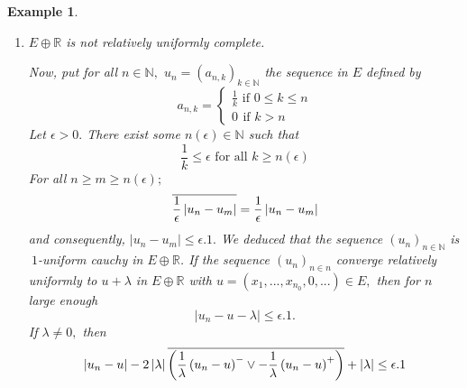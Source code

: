 \documentclass{birkau}
\numberwithin{equation}{section}
\theoremstyle{plain}
\newtheorem{example}[theorem]{Example}
\theoremstyle{definition}
\begin{document}
\begin{example}
\begin{enumerate}
		\item $E\oplus 
		\mathbb{R}
		$ is not relatively uniformly complete.
		
		Now, put for all $n\in 
		\mathbb{N}
		,$ $u_{n}=\left( a_{n,k}\right) _{k\in 
			\mathbb{N}
		}$ the sequence in $E$ defined by%
		\begin{equation*}
			a_{n,k}=\left\{ 
			\begin{array}{l}
				\frac{1}{k}\text{ if }0\leq k\leq n \\ 
				0\,\ \text{if }k>n%
			\end{array}%
			\right. 
		\end{equation*}%
		Let $\epsilon >0.$ There exist some $n(\epsilon )\in 
		\mathbb{N}
		$ such that%
		\begin{equation*}
			\frac{1}{k}\leq \epsilon \text{ for all }k\geq n(\epsilon )
		\end{equation*}%
		For all $n\geq m\geq n(\epsilon );$%
		\begin{equation*}
			\overline{\frac{1}{\epsilon }\left\vert u_{n}-u_{m}\right\vert }=\frac{1}{%
				\epsilon }\left\vert u_{n}-u_{m}\right\vert 
		\end{equation*}%
		and consequently, $\left\vert u_{n}-u_{m}\right\vert \leq \epsilon .1.$ We
		deduced that the sequence $(u_{n})_{n\in 
			\mathbb{N}
		}$ is $\ 1$-uniform cauchy in $E\oplus 
		\mathbb{R}
		$. If the sequence $\left( u_{n}\right) _{n\in n}$ converge relatively
		uniformly to $u+\lambda $ in $E\oplus 
		\mathbb{R}
		$ with $u=\left( x_{1},...,x_{n_{0}},0,...\right)\in E ,$ then for $n$ large
		enough%
		\begin{equation*}
			\left\vert u_{n}-u-\lambda \right\vert \leq \epsilon .1.
		\end{equation*}%
		If $\lambda \neq 0,$ then%
		\begin{equation*}
			\left\vert u_{n}-u\right\vert -2\left\vert \lambda \right\vert \overline{%
				\left( \frac{1}{\lambda }\left( u_{n}-u\right) ^{-}\vee -\frac{1}{\lambda }%
				\left( u_{n}-u\right) ^{+}\right) }+\left\vert \lambda \right\vert \leq
			\epsilon .1
		\end{equation*}%

\end{enumerate}
\end{example}
\end{document}
